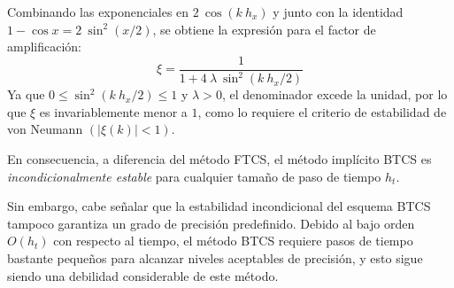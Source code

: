 Combinando las exponenciales en $2 \: \cos(k \: h_{x})$ y junto con la identidad $1 - \cos x = 2 \: \sin^{2} (x/2)$, se obtiene la expresión para el factor de amplificación:
\begin{equation}
\xi = \dfrac{1}{1 + 4 \: \lambda \: \sin^{2}(k \: h_{x} / 2)}
\label{eq:ecuacion_13_70}
\end{equation}
Ya que $0 \leq \sin^{2}(k \: h_{x} / 2) \leq 1$ y $\lambda > 0$, el denominador excede la unidad, por lo que $\xi$ es invariablemente menor a $1$, como lo requiere el criterio de estabilidad de von Neumann $(\vert \xi (k) \vert < 1)$.
\par
En consecuencia, a diferencia del método FTCS, el método implícito BTCS es \emph{incondicionalmente estable} para cualquier tamaño de paso de tiempo $h_{t}$.
\par
Sin embargo, cabe señalar que la estabilidad incondicional del esquema BTCS tampoco garantiza un grado de precisión predefinido. Debido al bajo orden $O(h_{t})$ con respecto al tiempo, el método BTCS requiere pasos de tiempo bastante pequeños para alcanzar niveles aceptables de precisión, y esto sigue siendo una debilidad considerable de este método.
